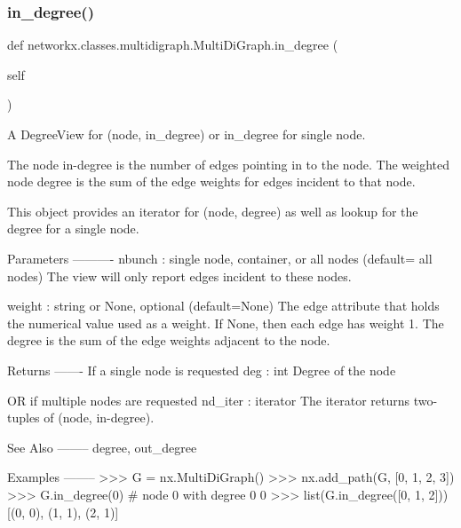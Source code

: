  \mbox{\label{classnetworkx_1_1classes_1_1multidigraph_1_1MultiDiGraph_a1ed0da17d51447a6df05c7dd5cfd0a80}} 
\subsubsection{\texorpdfstring{in\+\_\+degree()}{in\_degree()}}
{\footnotesize\ttfamily def networkx.\+classes.\+multidigraph.\+Multi\+Di\+Graph.\+in\+\_\+degree (\begin{DoxyParamCaption}\item[{}]{self }\end{DoxyParamCaption})}

\begin{DoxyVerb}A DegreeView for (node, in_degree) or in_degree for single node.

The node in-degree is the number of edges pointing in to the node.
The weighted node degree is the sum of the edge weights for
edges incident to that node.

This object provides an iterator for (node, degree) as well as
lookup for the degree for a single node.

Parameters
----------
nbunch : single node, container, or all nodes (default= all nodes)
    The view will only report edges incident to these nodes.

weight : string or None, optional (default=None)
   The edge attribute that holds the numerical value used
   as a weight.  If None, then each edge has weight 1.
   The degree is the sum of the edge weights adjacent to the node.

Returns
-------
If a single node is requested
deg : int
    Degree of the node

OR if multiple nodes are requested
nd_iter : iterator
    The iterator returns two-tuples of (node, in-degree).

See Also
--------
degree, out_degree

Examples
--------
>>> G = nx.MultiDiGraph()
>>> nx.add_path(G, [0, 1, 2, 3])
>>> G.in_degree(0)  # node 0 with degree 0
0
>>> list(G.in_degree([0, 1, 2]))
[(0, 0), (1, 1), (2, 1)]\end{DoxyVerb}
 \mbox{\label{classnetworkx_1_1classes_1_1multidigraph_1_1MultiDiGraph_a5947a3cfb062e1856db0eec3a70cac42}} 
